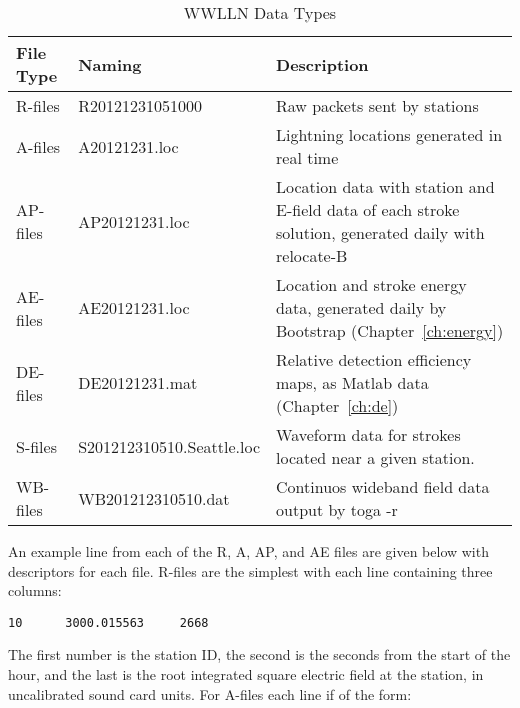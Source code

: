 \begin{table}[h!]
\begin{center}
\caption{WWLLN Data Types}
\begin{tabular}{|p{.75in}|p{2in}|p{3.5in}|}

\hline
{\bf File Type} & {\bf Naming} &	{\bf Description} \\

\hline
\rule{0pt}{3ex}
R-files	& R20121231051000	&	Raw packets sent by stations\\ 

\hline
\rule{0pt}{3ex}
A-files	& A20121231.loc	&	Lightning locations generated in real time\\ 

\hline
\rule{0pt}{3ex}
AP-files	& AP20121231.loc	&	Location data with station and E-field data of each stroke solution, generated daily with relocate-B\\ 

\hline
\rule{0pt}{3ex}
AE-files	& AE20121231.loc	&	Location and stroke energy data, generated daily by Bootstrap (Chapter~\ref{ch:energy})\\ 

\hline
\rule{0pt}{3ex}
DE-files	& DE20121231.mat	&	Relative detection efficiency maps, as Matlab data (Chapter~\ref{ch:de})\\ 

\hline
\rule{0pt}{3ex}
S-files	& S201212310510.Seattle.loc	&	Waveform data for strokes located near a given station.\\ 

\hline
\rule{0pt}{3ex}
WB-files	& WB201212310510.dat	&	Continuos wideband field data output by toga -r\\ 

\hline
\end{tabular}
\end{center}
\label{code:fileType}
\end{table}
 
An example line from each of the R, A, AP, and AE files are given below with descriptors for each file.
R-files are the simplest with each line containing three columns:

\begin{verbatim}
10      3000.015563     2668
\end{verbatim}

The first number is the station ID, the second is the seconds from the start of the hour, and the last is the root integrated square electric field at the station, in uncalibrated sound card units.
For A-files each line if of the form:

